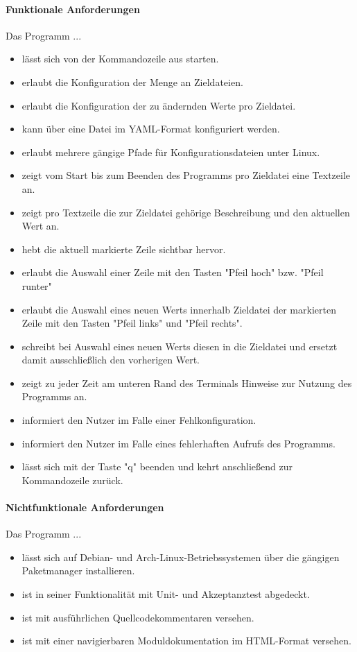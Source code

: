 \paragraph{Funktionale Anforderungen}
Das Programm ...
\begin{itemize}
    \item lässt sich von der Kommandozeile aus starten.
    \item erlaubt die Konfiguration der Menge an Zieldateien.
    \item erlaubt die Konfiguration der zu ändernden Werte pro Zieldatei.
    \item kann über eine Datei im YAML-Format konfiguriert werden.
    \item erlaubt mehrere gängige Pfade für Konfigurationsdateien unter Linux.
    \item zeigt vom Start bis zum Beenden des Programms pro Zieldatei eine Textzeile an.
    \item zeigt pro Textzeile die zur Zieldatei gehörige Beschreibung und den aktuellen Wert an.
    \item hebt die aktuell markierte Zeile sichtbar hervor.
    \item erlaubt die Auswahl einer Zeile mit den Tasten "Pfeil hoch" bzw. "Pfeil runter"
    \item erlaubt die Auswahl eines neuen Werts innerhalb Zieldatei der markierten
          Zeile mit den Tasten "Pfeil links" und "Pfeil rechts".
    \item schreibt bei Auswahl eines neuen Werts diesen in die Zieldatei und ersetzt
          damit ausschließlich den vorherigen Wert.
    \item zeigt zu jeder Zeit am unteren Rand des Terminals Hinweise zur Nutzung
          des Programms an.
    \item informiert den Nutzer im Falle einer Fehlkonfiguration.
    \item informiert den Nutzer im Falle eines fehlerhaften Aufrufs des Programms.
    \item lässt sich mit der Taste "q" beenden und kehrt anschließend zur Kommandozeile zurück.
\end{itemize}

\paragraph{Nichtfunktionale Anforderungen}
Das Programm ...
\begin{itemize}
    \item lässt sich auf Debian- und Arch-Linux-Betriebssystemen über die gängigen
          Paketmanager installieren.
    \item ist in seiner Funktionalität mit Unit- und Akzeptanztest abgedeckt.
    \item ist mit ausführlichen Quellcodekommentaren versehen.
    \item ist mit einer navigierbaren Moduldokumentation im HTML-Format versehen.
\end{itemize}

